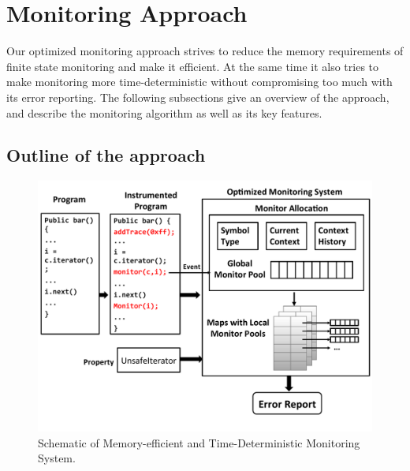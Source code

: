 \section{Monitoring Approach}
\label{sec:approach}

Our optimized monitoring approach strives to reduce the memory requirements
of finite state monitoring and make it efficient. At the same time it also tries to make monitoring more 
time-deterministic without compromising too much with its error reporting. The following subsections
give an overview of the approach, and describe the monitoring algorithm as well as its key features.



\subsection{Outline of the approach}
\label{subsec:outline}

\begin{figure}[t]
\centering
  \includegraphics[width=\linewidth]{./images/optimized_monitoring_scheme.pdf}
  \caption[Schematic of Memory-efficient and Time-Deterministic Monitoring 
System]{Schematic of Memory-efficient and Time-Deterministic Monitoring System.}
  \label{fig:schematic}
\end{figure}

